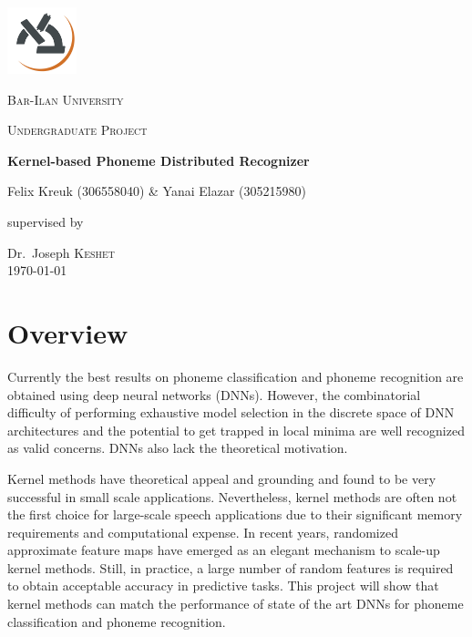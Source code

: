\documentclass[12pt,a4paper]{article}
\begin{document}
\begin{titlepage}
	\centering
	\includegraphics[width=0.15\textwidth]{biu_logo.png}\par\vspace{1cm}
	{\scshape\LARGE Bar-Ilan University \par}
	\vspace{1cm}
	{\scshape\Large Undergraduate Project\par}
	\vspace{1cm}
	{\huge\bfseries Kernel-based Phoneme Distributed Recognizer\par}
	\vspace{1cm}
	{\Large Felix Kreuk (306558040) \& Yanai Elazar (305215980)\par}
	\vspace{1cm}
	supervised by\par
	Dr.~Joseph \textsc{Keshet}\\
	\vspace{5cm}
{\large \today}
\end{titlepage}

\tableofcontents
\newpage

\section{Overview}
Currently the best results on phoneme classification and phoneme recognition are obtained using deep neural networks (DNNs). However, the combinatorial difficulty of performing exhaustive model selection in the discrete space of DNN architectures and the potential to get trapped in local minima are well recognized as valid concerns. DNNs also lack the theoretical motivation.

Kernel methods have theoretical appeal and grounding and found to be very successful in small scale applications. Nevertheless, kernel methods are often not the first choice for large-scale speech applications due to their significant memory requirements and computational expense. In recent years, randomized approximate feature maps have emerged as an elegant mechanism to scale-up kernel methods. Still, in practice, a large number of random features is required to obtain acceptable accuracy in predictive tasks. This project will show that kernel methods can match the performance of state of the art DNNs for phoneme classification and phoneme recognition. 
\end{document}
